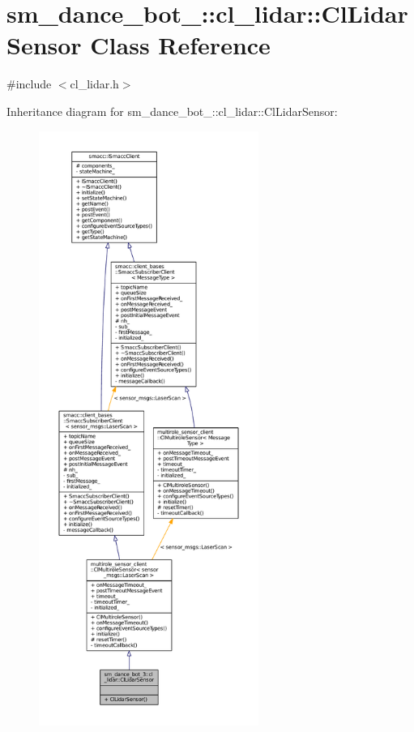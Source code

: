 \hypertarget{classsm__dance__bot__3_1_1cl__lidar_1_1ClLidarSensor}{}\section{sm\+\_\+dance\+\_\+bot\+\_\+:\+:cl\+\_\+lidar\+:\+:Cl\+Lidar\+Sensor Class Reference}
\label{classsm__dance__bot__3_1_1cl__lidar_1_1ClLidarSensor}


{\ttfamily \#include $<$cl\+\_\+lidar.\+h$>$}



Inheritance diagram for sm\+\_\+dance\+\_\+bot\+\_\+:\+:cl\+\_\+lidar\+:\+:Cl\+Lidar\+Sensor\+:
\nopagebreak
\begin{figure}[H]
\begin{center}
\leavevmode
\includegraphics[height=550pt]{classsm__dance__bot__3_1_1cl__lidar_1_1ClLidarSensor__inherit__graph}
\end{center}
\end{figure}


